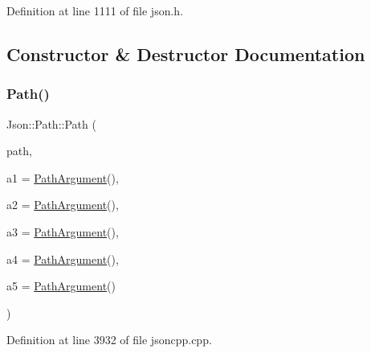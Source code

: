 Definition at line 1111 of file json.\+h.



\subsection{Constructor \& Destructor Documentation}
\hypertarget{class_json_1_1_path_a7356c0e9c1fc2276390fd396271c1300}{}\label{class_json_1_1_path_a7356c0e9c1fc2276390fd396271c1300} 
\subsubsection{\texorpdfstring{Path()}{Path()}\hspace{0.1cm}{\footnotesize\ttfamily [1/2]}}
{\footnotesize\ttfamily Json\+::\+Path\+::\+Path (\begin{DoxyParamCaption}\item[{const \hyperlink{config_8h_a1e723f95759de062585bc4a8fd3fa4be}{J\+S\+O\+N\+C\+P\+P\+\_\+\+S\+T\+R\+I\+NG} \&}]{path,  }\item[{const \hyperlink{class_json_1_1_path_argument}{Path\+Argument} \&}]{a1 = {\ttfamily \hyperlink{class_json_1_1_path_argument}{Path\+Argument}()},  }\item[{const \hyperlink{class_json_1_1_path_argument}{Path\+Argument} \&}]{a2 = {\ttfamily \hyperlink{class_json_1_1_path_argument}{Path\+Argument}()},  }\item[{const \hyperlink{class_json_1_1_path_argument}{Path\+Argument} \&}]{a3 = {\ttfamily \hyperlink{class_json_1_1_path_argument}{Path\+Argument}()},  }\item[{const \hyperlink{class_json_1_1_path_argument}{Path\+Argument} \&}]{a4 = {\ttfamily \hyperlink{class_json_1_1_path_argument}{Path\+Argument}()},  }\item[{const \hyperlink{class_json_1_1_path_argument}{Path\+Argument} \&}]{a5 = {\ttfamily \hyperlink{class_json_1_1_path_argument}{Path\+Argument}()} }\end{DoxyParamCaption})}



Definition at line 3932 of file jsoncpp.\+cpp.

\hypertarget{class_json_1_1_path_a7356c0e9c1fc2276390fd396271c1300}{}\label{class_json_1_1_path_a7356c0e9c1fc2276390fd396271c1300} 
